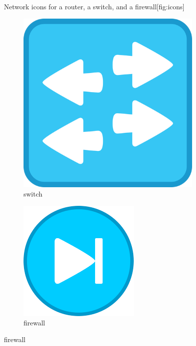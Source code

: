 \begin{figure}
\begin{sidecaption}{Network icons for a router, a switch, and a firewall}[fig:icons]
\begin{subfigure}[b]{18mm}
   \includegraphics[width=\textwidth]{images/introduction/switch.png}
   \caption{switch}
   \label{fig:icon-switch}
   \end{subfigure}
   \qquad
   \begin{subfigure}[b]{18mm}
   \includegraphics[width=\textwidth]{images/introduction/firewall.png}
   \caption{firewall}
   \label{fig:icon-firewall}
   \end{subfigure}
\end{sidecaption}
\end{figure}

